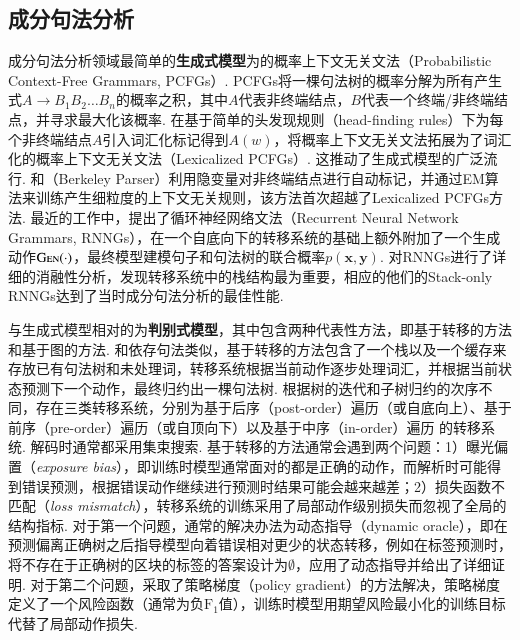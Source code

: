 \subsection{成分句法分析}

成分句法分析领域最简单的\textbf{生成式模型}为的概率上下文无关文法（Probabilistic Context-Free Grammars, PCFGs）.
PCFGs将一棵句法树的概率分解为所有产生式$A\rightarrow B_1B_2\dots B_n$的概率之积，其中$A$代表非终端结点，$B$代表一个终端/非终端结点，并寻求最大化该概率.
\citet{collins-1997-three}在基于简单的头发现规则（head-finding rules）下为每个非终端结点$A$引入词汇化标记得到$A(w)$，将概率上下文无关文法拓展为了词汇化的概率上下文无关文法（Lexicalized PCFGs）.
这推动了生成式模型的广泛流行.
\citet{matsuzaki-etal-2005-probabilistic}和\citet{petrov-etal-2006-learning}（Berkeley Parser）利用隐变量对非终端结点进行自动标记，并通过EM算法来训练产生细粒度的上下文无关规则，该方法首次超越了Lexicalized PCFGs方法.
最近的工作中，\citet{dyer-etal-2016-recurrent}提出了循环神经网络文法（Recurrent Neural Network Grammars, RNNGs），在一个自底向下的转移系统的基础上额外附加了一个生成动作$\textsc{Gen}(\cdot)$，最终模型建模句子和句法树的联合概率$p(\boldsymbol{x},\boldsymbol{y})$.
\citet{kuncoro-etal-2017-recurrent}对RNNGs进行了详细的消融性分析，发现转移系统中的栈结构最为重要，相应的他们的Stack-only RNNGs达到了当时成分句法分析的最佳性能.

与生成式模型相对的为\textbf{判别式模型}，其中包含两种代表性方法，即基于转移的方法和基于图的方法.
和依存句法类似，基于转移的方法包含了一个栈以及一个缓存来存放已有句法树和未处理词，转移系统根据当前动作逐步处理词汇，并根据当前状态预测下一个动作，最终归约出一棵句法树.
根据树的迭代和子树归约的次序不同，存在三类转移系统，分别为基于后序（post-order）遍历（或自底向上）、基于前序（pre-order）遍历（或自顶向下）以及基于中序（in-order）遍历 \citep{liu-zhang-2017-order}的转移系统.
解码时通常都采用集束搜索.
基于转移的方法通常会遇到两个问题：1）曝光偏置（\emph{exposure bias}），即训练时模型通常面对的都是正确的动作，而解析时可能得到错误预测，根据错误动作继续进行预测时结果可能会越来越差；2）损失函数不匹配（\emph{loss mismatch}），转移系统的训练采用了局部动作级别损失而忽视了全局的结构指标.
对于第一个问题，通常的解决办法为动态指导（dynamic oracle），即在预测偏离正确树之后指导模型向着错误相对更少的状态转移，例如在标签预测时，将不存在于正确树的区块的标签的答案设计为$\emptyset$，\citet{cross-huang-2016-span}应用了动态指导并给出了详细证明.
对于第二个问题，\citet{fried-klein-2018-policy}采取了策略梯度（policy gradient）的方法解决，策略梯度定义了一个风险函数（通常为负$\mathrm{F}_1$值），训练时模型用期望风险最小化的训练目标代替了局部动作损失.

